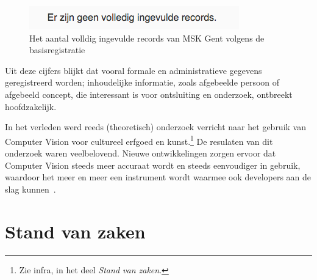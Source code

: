 \documentclass[fleqn,10pt]{voorstel}
\begin{document}
\begin{figure}[h]
	\caption{Het aantal volldig ingevulde records van MSK Gent volgens de basisregistratie}
	\centering
	\includegraphics[width=\linewidth]{pictures/VKC_aantal_basis}
\end{figure}


Uit deze cijfers blijkt dat vooral formale en administratieve gegevens geregistreerd worden; inhoudelijke informatie, zoals afgebeelde persoon of afgebeeld concept, die interessant is voor ontsluiting en onderzoek, ontbreekt hoofdzakelijk.

In het verleden werd reeds (theoretisch) onderzoek verricht naar het gebruik van Computer Vision voor cultureel erfgoed en kunst.\footnote{Zie infra, in het deel \emph{Stand van zaken}.} De resulaten van dit onderzoek waren veelbelovend. Nieuwe ontwikkelingen zorgen ervoor dat Computer Vision steeds meer accuraat wordt en steeds eenvoudiger in gebruik, waardoor het meer en meer een instrument wordt waarmee ook developers aan de slag kunnen~\autocite{Hindle2017}.



\section{Stand van zaken}
\label{sec:state-of-the-art}
\end{document}
